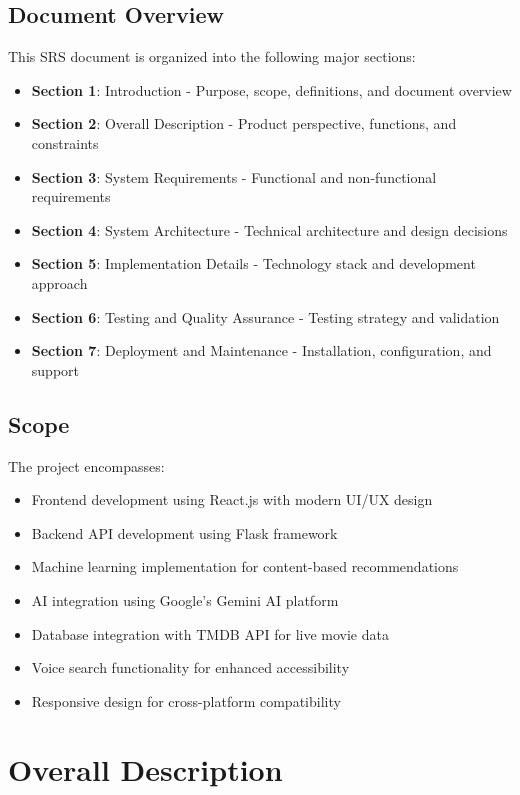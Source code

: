 \documentclass[12pt,a4paper]{article}
\begin{document}
\subsection{Document Overview}
This SRS document is organized into the following major sections:

\begin{itemize}
    \item \textbf{Section 1}: Introduction - Purpose, scope, definitions, and document overview
    \item \textbf{Section 2}: Overall Description - Product perspective, functions, and constraints
    \item \textbf{Section 3}: System Requirements - Functional and non-functional requirements
    \item \textbf{Section 4}: System Architecture - Technical architecture and design decisions
    \item \textbf{Section 5}: Implementation Details - Technology stack and development approach
    \item \textbf{Section 6}: Testing and Quality Assurance - Testing strategy and validation
    \item \textbf{Section 7}: Deployment and Maintenance - Installation, configuration, and support
\end{itemize}

\subsection{Scope}
The project encompasses:
\begin{itemize}
    \item Frontend development using React.js with modern UI/UX design
    \item Backend API development using Flask framework
    \item Machine learning implementation for content-based recommendations
    \item AI integration using Google's Gemini AI platform
    \item Database integration with TMDB API for live movie data
    \item Voice search functionality for enhanced accessibility
    \item Responsive design for cross-platform compatibility
\end{itemize}

\section{Overall Description}
\end{document}
